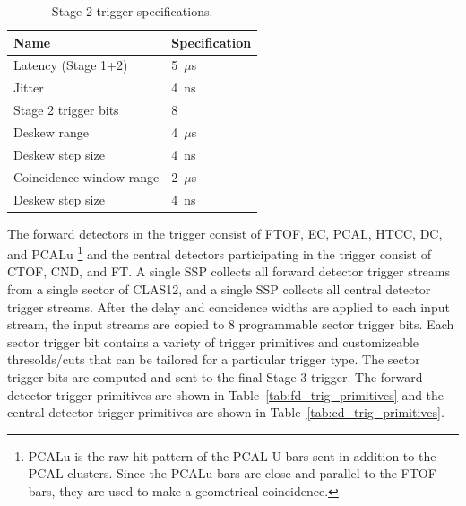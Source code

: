 \begin{table}
\begin{center}
	\begin{tabular}{| l | l |}
		\hline \hline
		Name				& Specification	\\
		\hline
		Latency (Stage 1+2)		& 5~$\mu$s	\\
		Jitter				& 4~ns		\\
		Stage 2 trigger bits		& 8		\\
		Deskew range			& 4~$\mu$s	\\
		Deskew step size		& 4~ns	\\
		Coincidence window range	& 2~$\mu$s	\\
		Deskew step size		& 4~ns	\\
		\hline \hline
	\end{tabular}
\end{center}
\caption{Stage 2 trigger specifications.}
\label{tab:stage_2_specs}
\end{table}

The forward detectors in the trigger consist of FTOF, EC, PCAL, HTCC, DC, and PCALu \footnote{PCALu is the raw hit pattern of the PCAL U bars sent in addition to the PCAL clusters. Since the PCALu bars are close and parallel to the FTOF bars, they are used to make a geometrical coincidence.} and the central detectors participating in the trigger consist of CTOF, CND, and FT. A single SSP collects all forward detector trigger streams from a single sector of CLAS12, and a single SSP collects all central detector trigger streams. After the delay and concidence widths are applied to each input stream, the input streams are copied to 8 programmable sector trigger bits. Each sector trigger bit contains a variety of trigger primitives and customizeable thresolds/cuts that can be tailored for a particular trigger type. The sector trigger bits are computed and sent to the final Stage 3 trigger. The forward detector trigger primitives are shown in Table~\ref{tab:fd_trig_primitives} and the central detector trigger primitives are shown in Table~\ref{tab:cd_trig_primitives}.

